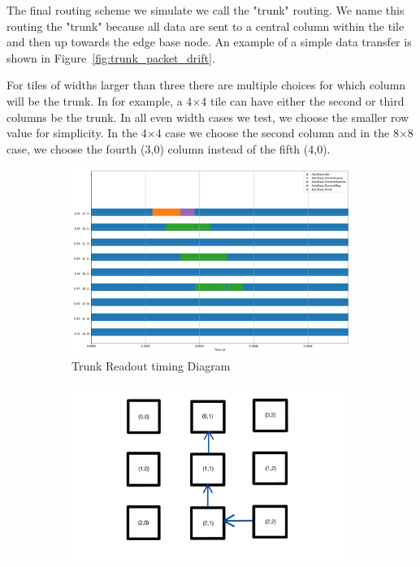 The final routing scheme we simulate we call the "trunk" routing.
We name this routing the "trunk" because all data are sent to a central column within the tile and then up towards the edge base node.
An example of a simple data transfer is shown in Figure~\ref{fig:trunk_packet_drift}.

For tiles of widths larger than three there are multiple choices for which column will be the trunk.
In for example, a 4$\times$4 tile can have either the second or third columns be the trunk.
In all even width cases we test, we choose the smaller row value for simplicity.
In the 4$\times$4 case we choose the second column and in the 8$\times$8 case, we choose the fourth (3,0) column instead of the fifth (4,0).

\begin{figure}
\centering
\begin{subfigure}{.5\textwidth}
  \centering
  \includegraphics[width=\textwidth]{images/trunk_timer.pdf}
  \caption{Trunk Readout timing Diagram}
\end{subfigure}%
\begin{subfigure}{.5\textwidth}
  \centering
  \includegraphics[width=\textwidth]{images/trunk_ex_read.pdf}

\end{subfigure}
\end{figure}
